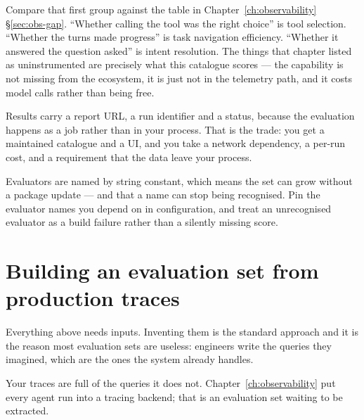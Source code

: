 \begin{note}
Compare that first group against the table in Chapter~\ref{ch:observability}
\S\ref{sec:obs-gap}. ``Whether calling the tool was the right choice'' is tool
selection. ``Whether the turns made progress'' is task navigation efficiency.
``Whether it answered the question asked'' is intent resolution. The things that
chapter listed as uninstrumented are precisely what this catalogue scores --- the
capability is not missing from the ecosystem, it is just not in the telemetry
path, and it costs model calls rather than being free.
\end{note}

Results carry a report URL, a run identifier and a status, because the evaluation
happens as a job rather than in your process. That is the trade: you get a
maintained catalogue and a UI, and you take a network dependency, a per-run cost,
and a requirement that the data leave your process.


\begin{versionbox}
Evaluators are named by string constant, which means the set can grow without a
package update --- and that a name can stop being recognised. Pin the evaluator
names you depend on in configuration, and treat an unrecognised evaluator as a
build failure rather than a silently missing score.
\end{versionbox}

\section{Building an evaluation set from production traces}
\label{sec:eval-set}

Everything above needs inputs. Inventing them is the standard approach and it is
the reason most evaluation sets are useless: engineers write the queries they
imagined, which are the ones the system already handles.

Your traces are full of the queries it does not. Chapter~\ref{ch:observability}
put every agent run into a tracing backend; that is an evaluation set waiting to
be extracted.

